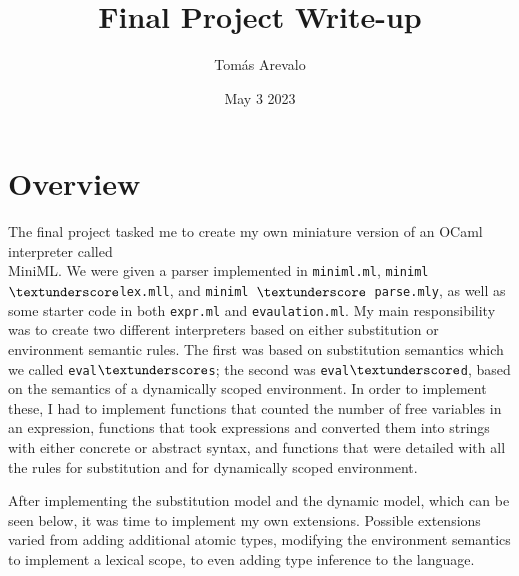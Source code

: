 \documentclass[12pt]{article}
\title{\textbf{Final Project Write-up}}
\author{Tomás Arevalo}
\date{May 3 2023}
\def\code#1{\texttt{#1}}
\begin{document}
\maketitle

\section{Overview}

\indent The final project tasked me to create my own miniature version of an OCaml interpreter called \\ MiniML. We were given a parser implemented in \code{miniml.ml}, \code{miniml$\textunderscore$lex.mll}, and \code{miniml $\textunderscore$ parse.mly}, as well as some starter code in both \code{expr.ml} and \code{evaulation.ml}. My main responsibility was to create two different interpreters based on either substitution or environment semantic rules. The first was based on substitution semantics which we called \code{eval$\textunderscore$s}; the second was \code{eval$\textunderscore$d}, based on the semantics of a dynamically scoped environment. In order to implement these, I had to implement functions that counted the number of free variables in an expression, functions that took expressions and converted them into strings with either concrete or abstract syntax, and functions that were detailed with all the rules for substitution and for dynamically scoped environment.

After implementing the substitution model and the dynamic model, which can be seen below, it was time to implement my own extensions. Possible extensions varied from adding additional atomic types, modifying the environment semantics to implement a lexical scope, to even adding type inference to the language.
\end{document}
